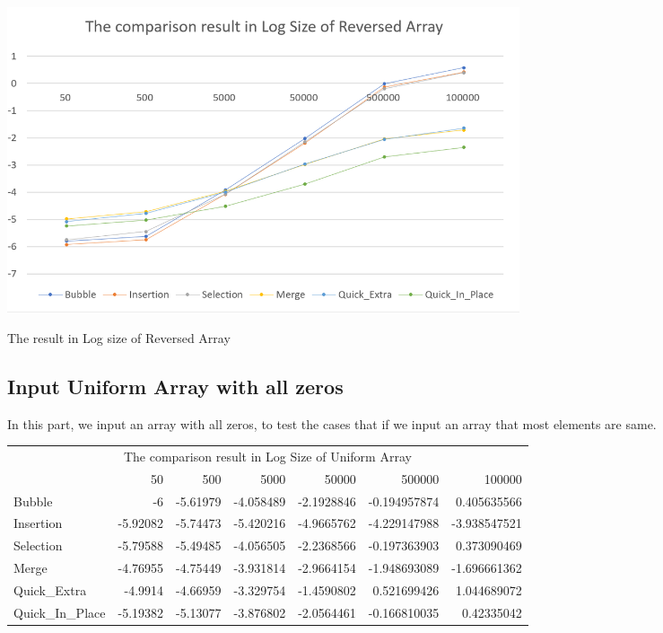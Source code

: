 \documentclass{article}
\begin{document}
\begin{center}
    \includegraphics[height = 9cm]{result4.PNG}
    \caption{The result in Log size of Reversed Array}
\end{center}

\subsection{Input Uniform Array with all zeros}
In this part, we input an array with all zeros, to test the cases that if we input an array that most elements are same.

\begin{table}[H]
  \centering
    \begin{tabular}{l | rrrrrr}
    \multicolumn{7}{c}{The comparison result in Log Size of Uniform Array} \\
          & 50    & 500   & 5000  & 50000  & 500000  & 100000  \\ \hline
    Bubble & -6    & -5.61979 & -4.058489 & -2.1928846 & -0.194957874 & 0.405635566 \\
    Insertion & -5.92082 & -5.74473 & -5.420216 & -4.9665762 & -4.229147988 & -3.938547521 \\
    Selection & -5.79588 & -5.49485 & -4.056505 & -2.2368566 & -0.197363903 & 0.373090469 \\
    Merge & -4.76955 & -4.75449 & -3.931814 & -2.9664154 & -1.948693089 & -1.696661362 \\
    Quick\_Extra & -4.9914 & -4.66959 & -3.329754 & -1.4590802 & 0.521699426 & 1.044689072 \\
    Quick\_In\_Place & -5.19382 & -5.13077 & -3.876802 & -2.0564461 & -0.166810035 & 0.42335042 \\
    \end{tabular}%
  \label{tab:addlabel}%
\end{table}%
\end{document}
